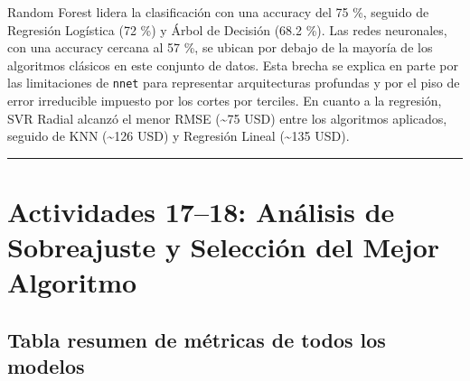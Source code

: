 \documentclass[
]{article}
\begin{document}
Random Forest lidera la clasificación con una accuracy del 75 \%,
seguido de Regresión Logística (72 \%) y Árbol de Decisión (68.2 \%).
Las redes neuronales, con una accuracy cercana al 57 \%, se ubican por
debajo de la mayoría de los algoritmos clásicos en este conjunto de
datos. Esta brecha se explica en parte por las limitaciones de
\texttt{nnet} para representar arquitecturas profundas y por el piso de
error irreducible impuesto por los cortes por terciles. En cuanto a la
regresión, SVR Radial alcanzó el menor RMSE (\textasciitilde75 USD)
entre los algoritmos aplicados, seguido de KNN (\textasciitilde126 USD)
y Regresión Lineal (\textasciitilde135 USD).

\begin{center}\rule{0.5\linewidth}{0.5pt}\end{center}

\section{Actividades 17--18: Análisis de Sobreajuste y Selección del
Mejor
Algoritmo}\label{actividades-1718-anuxe1lisis-de-sobreajuste-y-selecciuxf3n-del-mejor-algoritmo}

\subsection{Tabla resumen de métricas de todos los
modelos}\label{tabla-resumen-de-muxe9tricas-de-todos-los-modelos}
\end{document}
